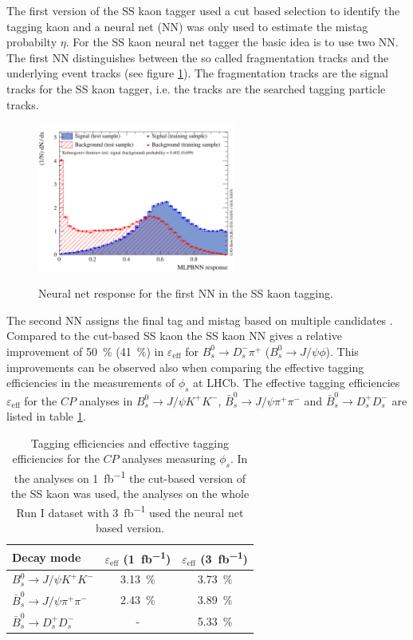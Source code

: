 \documentclass{PoS}
\begin{document}
The first version of the SS kaon tagger used a cut based selection to identify the tagging kaon and a neural net (NN) was only used to estimate the mistag probabilty $\eta$. For the SS kaon neural net tagger the basic idea is to use two NN. The first NN distinguishes between the so called fragmentation tracks and the underlying event tracks (see figure \ref{fig:nnet}). The fragmentation tracks are the signal tracks for the SS kaon tagger, i.e. the tracks are the searched tagging particle tracks. 
\begin{figure}[htbp]
	\begin{center}
		\includegraphics[width=0.58\textwidth, angle=0]{figs/sskaonNnetfirstNN3.pdf}
		\small{\caption{Neural net response for the first NN in the SS kaon tagging.}}
		\label{fig:nnet}
	\end{center}
\end{figure}
The second NN assigns the final tag and mistag based on multiple candidates \cite{13}.\\ 
Compared to the cut-based SS kaon the SS kaon NN gives a relative improvement of \SI{50}{\%} (\SI{41}{\%}) in $\varepsilon_\text{eff}$ for $B_s^0\to D_s^-\pi^+$ ($B_s^0\to J\!/\!\psi\phi$). This improvements can be observed also when comparing the effective tagging efficiencies in the measurements of $\phi_s$ at LHCb. The effective tagging efficiencies $\varepsilon_\text{eff}$ for the $C\!P$ analyses in \mbox{$B_s^0\to J\!/\!\psi K^+K^-$}, $\bar{B}_s^0\to J\!/\!\psi \pi^+\pi^-$ and $\bar{B}_s^0\to D_s^+D_s^-$ are listed in table \ref{tab:phis}.
\begin{table}[htbp]
  \centering
  \begin{tabular}{lcc}
  \toprule
Decay mode & $\varepsilon_\text{eff}$ (\SI{1}{fb^{-1}}) & $\varepsilon_\text{eff}$ (\SI{3}{fb^{-1}}) \\
  \midrule
  $B_s^0\to J\!/\!\psi K^+K^-$ & \SI{3.13}{\%} \cite{3} & \SI{3.73}{\%} \cite{4} \\ 
  $\bar{B}_s^0\to J\!/\!\psi \pi^+\pi^-$ & \SI{2.43}{\%} \cite{5} & \SI{3.89}{\%} \cite{6} \\
  $\bar{B}_s^0\to D_s^+D_s^-$ & - & \SI{5.33}{\%} \cite{7} \\
  \bottomrule
  \end{tabular}
 \small{ \caption{Tagging efficiencies and effective tagging efficiencies for the $C\!P$ analyses measuring $\phi_s$. In the analyses on \SI{1}{fb^{-1}} the cut-based version of the SS kaon was used, the analyses on the whole Run I dataset with \SI{3}{fb^{-1}} used the neural net based version. }}
  \label{tab:phis}
\end{table} 
\end{document}
